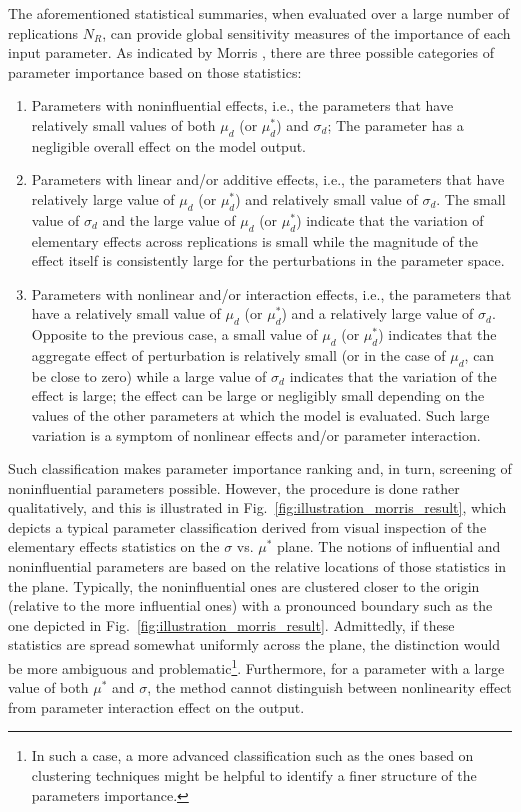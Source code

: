 The aforementioned statistical summaries, when evaluated over a large number of replications $N_R$,
can provide global sensitivity measures of the importance of each input parameter.
As indicated by Morris \cite{Morris1991}, there are three possible categories of parameter importance based on those statistics:
\begin{enumerate}
	\item Parameters with noninfluential effects, i.e., the parameters that have relatively small values of both $\mu_d$ (or $\mu^*_d$) and $\sigma_d$;
	The parameter has a negligible overall effect on the model output.
	\item Parameters with linear and/or additive effects, i.e., the parameters that have relatively large value of $\mu_d$ (or $\mu^*_d$) and relatively small value of $\sigma_d$.
	The small value of $\sigma_d$ and the large value of $\mu_d$ (or $\mu^*_d$) indicate that the variation of elementary effects across replications is small while the magnitude of the effect itself is consistently large for the perturbations in the parameter space.
	\item Parameters with nonlinear and/or interaction effects, i.e., the parameters that have a relatively small value of $\mu_d$ (or $\mu^*_d$) and a relatively large value of $\sigma_d$.
	Opposite to the previous case, a small value of $\mu_d$ (or $\mu^*_d$) indicates that the aggregate effect of perturbation is relatively small (or in the case of $\mu_d$, can be close to zero) while a large value of $\sigma_d$ indicates that the variation of the effect is large; the effect can be large or negligibly small depending on the values of the other parameters at which the model is evaluated.
	Such large variation is a symptom of nonlinear effects and/or parameter interaction.
\end{enumerate}

Such classification makes parameter importance ranking and, in turn, screening of noninfluential parameters possible.
However, the procedure is done rather qualitatively, and this is illustrated in Fig.~\ref{fig:illustration_morris_result}, 
which depicts a typical parameter classification derived from visual inspection of the elementary effects statistics on the $\sigma$ vs. $\mu^*$ plane.
The notions of influential and noninfluential parameters are based on the relative locations of those statistics in the plane.
Typically, the noninfluential ones are clustered closer to the origin (relative to the more influential ones) with a pronounced boundary such as the one depicted in Fig.~\ref{fig:illustration_morris_result}. 
Admittedly, if these statistics are spread somewhat uniformly across the plane, 
the distinction would be more ambiguous and problematic\footnote{In such a case, a more advanced classification such as the ones based on clustering techniques might be helpful to identify a finer structure of the parameters importance.}.
Furthermore, for a parameter with a large value of both $\mu^*$ and $\sigma$,
the method cannot distinguish between nonlinearity effect from parameter interaction effect on the output.

